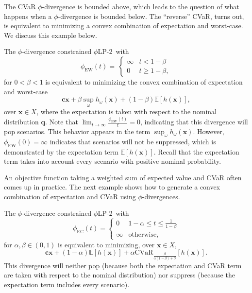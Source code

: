\documentclass[opre,nonblindrev]{informs3} %
\newcommand{\E}{\mathbb{E}}
\newcommand{\e}[1]{\E \left[ #1 \right]}
\newcommand{\x}{\mathbf{x}}
\renewcommand{\c}{\mathbf{c}}
\newcommand{\q}{\mathbf{q}}
\newcommand{\plp}{$\phi$LP-2}
\begin{document}
The CVaR $\phi$-divergence is bounded above, which leads to the question of what happens when a $\phi$-divergence is bounded below.
The ``reverse'' CVaR, turns out, is equivalent to minimizing a convex combination of expectation and worst-case. 
We discuss this example below. 


\begin{example}
	\label{ex:rcvar}
	The $\phi$-divergence constrained \plp\ with
	\[
		\phi_{\text{EW}}(t) = \
		\begin{cases}
			\infty & t < 1-\beta \\
			0 & t \geq 1-\beta,
		\end{cases}
	\]
	for $0 < \beta < 1$ is equivalent to minimizing the convex combination of expectation and worst-case
	\[
		\c\x + \beta \sup_\omega h_\omega(\x) + (1-\beta)\e{h(\x)},
	\]
	over $\x \in X$, where the expectation is taken with respect to the nominal distribution $\q$.
	Note that $\lim_{t \rightarrow \infty} \frac{\phi_{\text{EW}}(t)}{t} = 0$, indicating that this divergence will pop scenarios.
	This behavior appears in the term $\sup_\omega h_\omega(\x)$.
	However, $\phi_{\text{EW}}(0) = \infty$ indicates that scenarios will not be suppressed, which is demonstrated by the expectation term $\e{h(\x)}$. 
	Recall that the expectation term takes into account every scenario with positive nominal probability.
	\Halmos
\end{example}



An objective function taking a weighted sum of expected value and CVaR often comes up in practice.
The next example shows how to generate a convex combination of expectation and CVaR using $\phi$-divergences.

\begin{example}
	\label{ex:cvar_expectation}
	The $\phi$-divergence constrained \plp\ with
	\[
		\phi_{\text{EC}}(t) = 
		\begin{cases}
			0 & 1-\alpha \leq t \leq \frac{1}{1-\beta} \\
			\infty & \text{otherwise},
		\end{cases}
	\]
	for $\alpha,\beta \in (0,1)$ is equivalent to minimizing, over $\x \in X$,
	\[
		\c\x + (1-\alpha)\e{h(\x)} + \alpha \mbox{CVaR}_{\frac{\beta}{\alpha(1-\beta)+\beta}}[h(\x)].
	\]
	This divergence will neither pop (because both the expectation and CVaR term are taken with respect to the nominal distribution) nor suppress (because the expectation term includes every scenario).
	\Halmos
\end{example}
\end{document}
